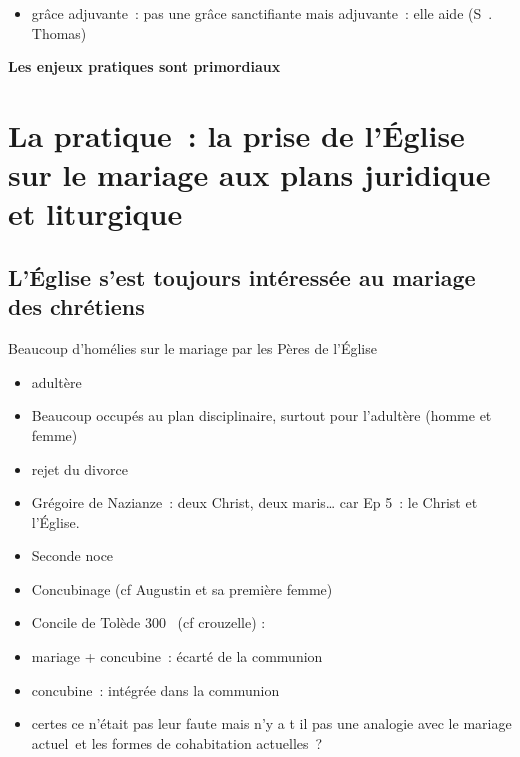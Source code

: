 \begin{itemize}
\item
  grâce adjuvante~: pas une grâce sanctifiante mais adjuvante~: elle
  aide (S~. Thomas)
\end{itemize}

\textbf{Les enjeux pratiques sont primordiaux}

\hypertarget{la-pratique-la-prise-de-luxe9glise-sur-le-mariage-aux-plans-juridique-et-liturgique}{%
\section{La pratique~: la prise de l'Église sur le mariage aux plans
juridique et
liturgique}\label{la-pratique-la-prise-de-luxe9glise-sur-le-mariage-aux-plans-juridique-et-liturgique}}

\hypertarget{luxe9glise-sest-toujours-intuxe9ressuxe9e-au-mariage-des-chruxe9tiens}{%
\subsection{L'Église s'est toujours intéressée au mariage des
chrétiens}\label{luxe9glise-sest-toujours-intuxe9ressuxe9e-au-mariage-des-chruxe9tiens}}

Beaucoup d'homélies sur le mariage par les Pères de l'Église

\begin{itemize}
\item
  adultère
\item
   
  Beaucoup occupés au plan disciplinaire, surtout pour l'adultère (homme
  et femme)
   
\item
  rejet du divorce
\item
   
  Grégoire de Nazianze~: deux Christ, deux maris\ldots{} car Ep 5~: le
  Christ et l'Église.
   
\item
  Seconde noce
\item
  Concubinage (cf Augustin et sa première femme)
\item
   
  Concile de Tolède 300~ (cf crouzelle) :
   
\item
   
  mariage + concubine~: écarté de la communion
   
\item
   
  concubine~: intégrée dans la communion
   
\item
   
  certes ce n'était pas leur faute mais n'y a t il pas une analogie avec
  le mariage actuel~et les formes de cohabitation actuelles~?
   
\end{itemize}


